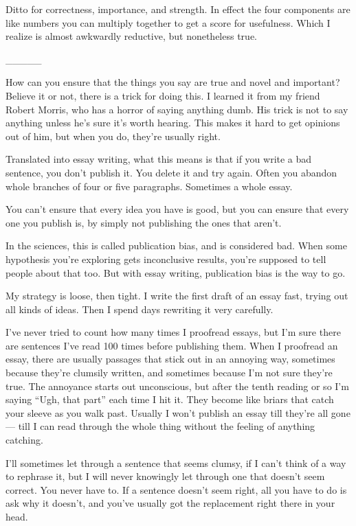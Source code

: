 \documentclass[12pt]{book}
\begin{document}
Ditto for correctness, importance, and strength. In effect the four
components are like numbers you can multiply together to get a score for
usefulness. Which I realize is almost awkwardly reductive, but
nonetheless true.

\_\_\_\_\_

How can you ensure that the things you say are true and novel and
important? Believe it or not, there is a trick for doing this. I learned
it from my friend Robert Morris, who has a horror of saying anything
dumb. His trick is not to say anything unless he's sure it's worth
hearing. This makes it hard to get opinions out of him, but when you do,
they're usually right.

Translated into essay writing, what this means is that if you write a
bad sentence, you don't publish it. You delete it and try again. Often
you abandon whole branches of four or five paragraphs. Sometimes a whole
essay.

You can't ensure that every idea you have is good, but you can ensure
that every one you publish is, by simply not publishing the ones that
aren't.

In the sciences, this is called publication bias, and is considered bad.
When some hypothesis you're exploring gets inconclusive results, you're
supposed to tell people about that too. But with essay writing,
publication bias is the way to go.

My strategy is loose, then tight. I write the first draft of an essay
fast, trying out all kinds of ideas. Then I spend days rewriting it very
carefully.

I've never tried to count how many times I proofread essays, but I'm
sure there are sentences I've read 100 times before publishing them.
When I proofread an essay, there are usually passages that stick out in
an annoying way, sometimes because they're clumsily written, and
sometimes because I'm not sure they're true. The annoyance starts out
unconscious, but after the tenth reading or so I'm saying ``Ugh, that
part'' each time I hit it. They become like briars that catch your
sleeve as you walk past. Usually I won't publish an essay till they're
all gone --- till I can read through the whole thing without the feeling
of anything catching.

I'll sometimes let through a sentence that seems clumsy, if I can't
think of a way to rephrase it, but I will never knowingly let through
one that doesn't seem correct. You never have to. If a sentence doesn't
seem right, all you have to do is ask why it doesn't, and you've usually
got the replacement right there in your head.
\end{document}
